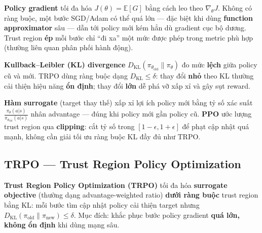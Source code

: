 \begin{ynghia}[title={Policy gradient và trust region}]
\textbf{Policy gradient} tối đa hóa $J(\theta) = \mathbb{E}[G]$ bằng cách leo theo $\nabla_\theta J$. Không có ràng buộc, một bước SGD/Adam có thể quá lớn --- đặc biệt khi dùng \textbf{function approximator} sâu --- dẫn tới policy mới kém hẳn dù gradient cục bộ dương. Trust region \textbf{ép} mỗi bước chỉ ``đi xa'' một mức được phép trong metric phù hợp (thường liên quan phân phối hành động).
\end{ynghia}

\begin{ynghia}[title={KL divergence}]
\textbf{Kullback--Leibler (KL) divergence} $D_{\mathrm{KL}}(\pi_{\theta_{\text{old}}} \| \pi_\theta)$ đo mức \textbf{lệch} giữa policy cũ và mới. TRPO dùng ràng buộc dạng $D_{\mathrm{KL}} \leq \delta$: thay đổi \textbf{nhỏ} theo KL thường cải thiện hiệu năng \textbf{ổn định}; thay đổi \textbf{lớn} dễ phá vỡ xấp xỉ và gây sụt reward.
\end{ynghia}

\begin{ynghia}[title={Surrogate objective và clipping (PPO)}]
\textbf{Hàm surrogate} (target thay thế) xấp xỉ lợi ích policy mới bằng tỷ số xác suất $\frac{\pi_\theta(a|s)}{\pi_{\theta_{\text{old}}}(a|s)}$ nhân advantage --- đúng khi policy mới gần policy cũ. \textbf{PPO} ước lượng trust region qua \textbf{clipping}: cắt tỷ số trong $[1-\epsilon, 1+\epsilon]$ để phạt cập nhật quá mạnh, không cần giải tối ưu ràng buộc KL đầy đủ như TRPO.
\end{ynghia}

\subsection{TRPO --- Trust Region Policy Optimization}

\begin{dinhnghia}[title={TRPO}]
\textbf{Trust Region Policy Optimization (TRPO)} tối đa hóa \textbf{surrogate objective} (thường dạng advantage-weighted ratio) \textbf{dưới ràng buộc} trust region bằng KL: mỗi bước tìm cập nhật policy cải thiện target nhưng $D_{\mathrm{KL}}(\pi_{\text{old}} \| \pi_{\text{new}}) \leq \delta$. Mục đích: khắc phục bước policy gradient \textbf{quá lớn, không ổn định} khi dùng mạng sâu.
\end{dinhnghia}

